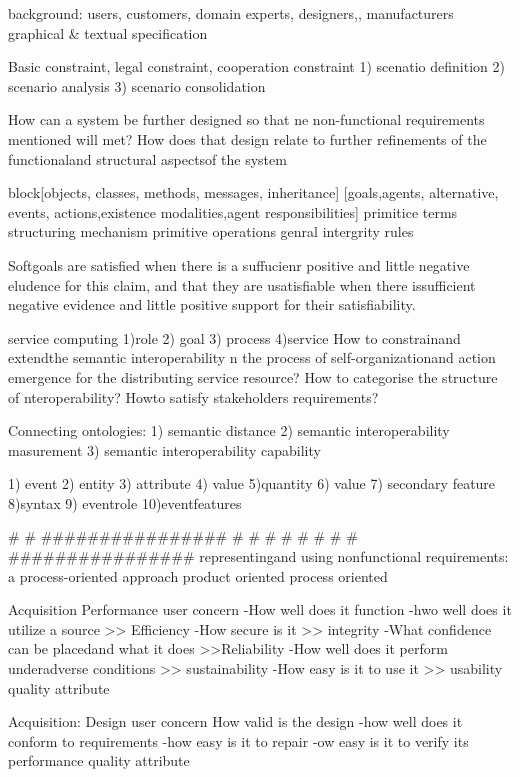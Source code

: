 background: users, customers, domain experts, designers,, manufacturers
graphical & textual specification

Basic constraint, legal constraint, cooperation constraint
1) scenatio  definition
2) scenario analysis
3) scenario consolidation

How can a system be 	 further designed	so that ne non-functional requirements mentioned will met?
How does that design relate to further refinements of the functionaland structural aspectsof the system

block[objects, classes, methods, messages, inheritance]
[goals,agents, alternative, events, actions,existence modalities,agent responsibilities]
primitice terms
structuring mechanism
primitive operations
genral intergrity rules

Softgoals are satisfied when there is a suffucienr positive and little negative eludence for this claim, and that they are usatisfiable when there issufficient negative evidence and little positive support for their satisfiability.



service computing
1)role
2) goal
3) process
4)service
How to constrainand extendthe semantic interoperability n the process of self-organizationand action emergence for the distributing service resource?
How to categorise the  structure of nteroperability?
Howto satisfy stakeholders requirements?


Connecting ontologies:
1) semantic distance
2) semantic interoperability masurement
3) semantic interoperability capability

1) event
2) entity
3) attribute
4) value
5)quantity
6) value
7) secondary feature
8)syntax
9) eventrole
10)eventfeatures





# # ################
# # #
# # #
# # ################
representingand using nonfunctional requirements: a process-oriented approach
product oriented
process oriented


Acquisition Performance
user concern
-How well does it function
-hwo well does it utilize a source >> Efficiency
-How secure is it >> integrity
-What confidence can be placedand what it does >>Reliability
-How well does it perform underadverse conditions >> sustainability
-How easy is it to use it >> usability
quality attribute


Acquisition: Design
user concern
How valid is the design
-how well does it conform to requirements
-how easy is it to repair
-ow easy is it to verify its performance
quality attribute


